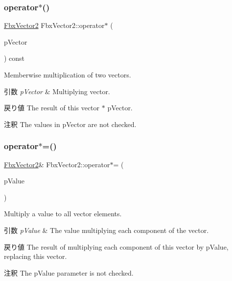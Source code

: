 \subsubsection{\texorpdfstring{operator$\ast$()}{operator*()}\hspace{0.1cm}{\footnotesize\ttfamily [2/2]}}
{\footnotesize\ttfamily \hyperlink{class_fbx_vector2}{Fbx\+Vector2} Fbx\+Vector2\+::operator$\ast$ (\begin{DoxyParamCaption}\item[{const \hyperlink{class_fbx_vector2}{Fbx\+Vector2} \&}]{p\+Vector }\end{DoxyParamCaption}) const}

Memberwise multiplication of two vectors. 
\begin{DoxyParams}{引数}
{\em p\+Vector} & Multiplying vector. \\
\hline
\end{DoxyParams}
\begin{DoxyReturn}{戻り値}
The result of this vector $\ast$ p\+Vector. 
\end{DoxyReturn}
\begin{DoxyRemark}{注釈}
The values in p\+Vector are not checked. 
\end{DoxyRemark}
\mbox{\label{class_fbx_vector2_adb53657fc2234707125a69fa8e8c55e1}} 
\subsubsection{\texorpdfstring{operator$\ast$=()}{operator*=()}\hspace{0.1cm}{\footnotesize\ttfamily [1/2]}}
{\footnotesize\ttfamily \hyperlink{class_fbx_vector2}{Fbx\+Vector2}\& Fbx\+Vector2\+::operator$\ast$= (\begin{DoxyParamCaption}\item[{double}]{p\+Value }\end{DoxyParamCaption})}

Multiply a value to all vector elements. 
\begin{DoxyParams}{引数}
{\em p\+Value} & The value multiplying each component of the vector. \\
\hline
\end{DoxyParams}
\begin{DoxyReturn}{戻り値}
The result of multiplying each component of this vector by p\+Value, replacing this vector. 
\end{DoxyReturn}
\begin{DoxyRemark}{注釈}
The p\+Value parameter is not checked. 
\end{DoxyRemark}
\mbox{\label{class_fbx_vector2_aeef4474f48ac7dc57d0e159d0850f0c4}} 
